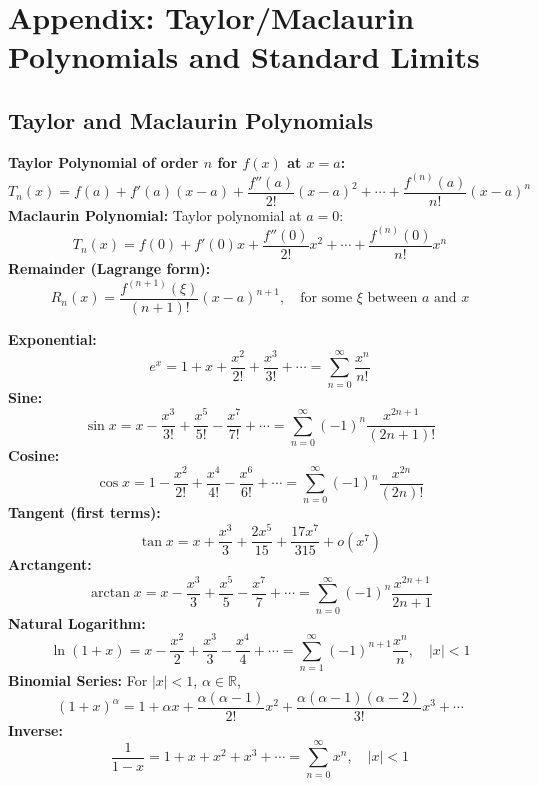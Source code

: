 \section*{Appendix: Taylor/Maclaurin Polynomials and Standard Limits}

\subsection*{Taylor and Maclaurin Polynomials}

\begin{cascade}
	\textbf{Taylor Polynomial of order $n$ for $f(x)$ at $x=a$:}
	\[
		T_n(x) = f(a) + f'(a)(x-a) + \frac{f''(a)}{2!}(x-a)^2 + \cdots + \frac{f^{(n)}(a)}{n!}(x-a)^n
	\]
	\textbf{Maclaurin Polynomial:} Taylor polynomial at $a=0$:
	\[
		T_n(x) = f(0) + f'(0)x + \frac{f''(0)}{2!}x^2 + \cdots + \frac{f^{(n)}(0)}{n!}x^n
	\]
	\textbf{Remainder (Lagrange form):}
	\[
		R_n(x) = \frac{f^{(n+1)}(\xi)}{(n+1)!}(x-a)^{n+1}, \quad \text{for some } \xi \text{ between } a \text{ and } x
	\]
\end{cascade}

\begin{cascade}
	\textbf{Exponential:}
	\[
		e^x = 1 + x + \frac{x^2}{2!} + \frac{x^3}{3!} + \cdots = \sum_{n=0}^\infty \frac{x^n}{n!}
	\]
	\textbf{Sine:}
	\[
		\sin x = x - \frac{x^3}{3!} + \frac{x^5}{5!} - \frac{x^7}{7!} + \cdots = \sum_{n=0}^\infty (-1)^n \frac{x^{2n+1}}{(2n+1)!}
	\]
	\textbf{Cosine:}
	\[
		\cos x = 1 - \frac{x^2}{2!} + \frac{x^4}{4!} - \frac{x^6}{6!} + \cdots = \sum_{n=0}^\infty (-1)^n \frac{x^{2n}}{(2n)!}
	\]
	\textbf{Tangent (first terms):}
	\[
		\tan x = x + \frac{x^3}{3} + \frac{2x^5}{15} + \frac{17x^7}{315} + o(x^7)
	\]
	\textbf{Arctangent:}
	\[
		\arctan x = x - \frac{x^3}{3} + \frac{x^5}{5} - \frac{x^7}{7} + \cdots = \sum_{n=0}^\infty (-1)^n \frac{x^{2n+1}}{2n+1}
	\]
	\textbf{Natural Logarithm:}
	\[
		\ln(1+x) = x - \frac{x^2}{2} + \frac{x^3}{3} - \frac{x^4}{4} + \cdots = \sum_{n=1}^\infty (-1)^{n+1} \frac{x^n}{n}, \quad |x| < 1
	\]
	\textbf{Binomial Series:} For $|x|<1$, $\alpha \in \mathbb{R}$,
	\[
		(1+x)^\alpha = 1 + \alpha x + \frac{\alpha(\alpha-1)}{2!}x^2 + \frac{\alpha(\alpha-1)(\alpha-2)}{3!}x^3 + \cdots
	\]
	\textbf{Inverse:}
	\[
		\frac{1}{1-x} = 1 + x + x^2 + x^3 + \cdots = \sum_{n=0}^\infty x^n, \quad |x| < 1
	\]
\end{cascade}

